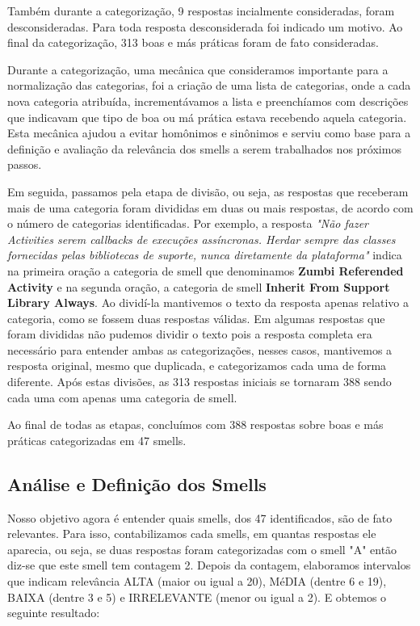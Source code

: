Tamb\'em durante a categoriza\c{c}\~ao, 9 respostas incialmente consideradas, foram desconsideradas. Para toda resposta desconsiderada foi indicado um motivo. Ao final da categoriza\c{c}\~ao, 313 boas e m\'as pr\'aticas foram de fato consideradas.

Durante a categoriza\c{c}\~ao, uma mec\^anica que consideramos importante para a normaliza\c{c}\~ao das categorias, foi a cria\c{c}\~ao de uma lista de categorias, onde a cada nova categoria atribu\'ida, increment\'avamos a lista e preench\'iamos com descri\c{c}\~oes que indicavam que tipo de boa ou m\'a pr\'atica estava recebendo aquela categoria. Esta mec\^anica ajudou a evitar hom\^onimos e sin\^onimos e serviu como base para a defini\c{c}\~ao e avalia\c{c}\~ao da relev\^ancia dos smells a serem trabalhados nos pr\'oximos passos.

Em seguida, passamos pela etapa de divis\~ao, ou seja, as respostas que receberam mais de uma categoria foram divididas em duas ou mais respostas, de acordo com o n\'umero de categorias identificadas. Por exemplo, a resposta \textit{"N\~ao fazer Activities serem callbacks de execu\c{c}\~oes ass\'incronas. Herdar sempre das classes fornecidas pelas bibliotecas de suporte, nunca diretamente da plataforma"} indica na primeira ora\c{c}\~ao a categoria de smell que denominamos \textbf{Zumbi Referended Activity} e na segunda ora\c{c}\~ao, a categoria de smell \textbf{Inherit From Support Library Always}. Ao divid\'i-la mantivemos o texto da resposta apenas relativo a categoria, como se fossem duas respostas v\'alidas. Em algumas respostas que foram divididas n\~ao pudemos dividir o texto pois a resposta completa era necess\'ario para entender ambas as categoriza\c{c}\~oes, nesses casos, mantivemos a resposta original, mesmo que duplicada, e categorizamos cada uma de forma diferente. Ap\'os estas divis\~oes, as 313 respostas iniciais se tornaram 388 sendo cada uma com apenas uma categoria de smell. 

Ao final de todas as etapas, conclu\'imos com 388 respostas sobre boas e m\'as pr\'aticas categorizadas em 47 smells. 

\subsection{An\'alise e Defini\c{c}\~ao dos Smells}
\label{sub:analisys-definition}

Nosso objetivo agora \'e entender quais smells, dos 47 identificados, s\~ao de fato relevantes. Para isso, contabilizamos cada smells, em quantas respostas ele aparecia, ou seja, se duas respostas foram categorizadas com o smell "A" ent\~ao diz-se que este smell tem contagem 2. Depois da contagem, elaboramos intervalos que indicam relev\^ancia ALTA (maior ou igual a 20), M\'eDIA (dentre 6 e 19), BAIXA (dentre 3 e 5) e IRRELEVANTE (menor ou igual a 2). E obtemos o seguinte resultado:

